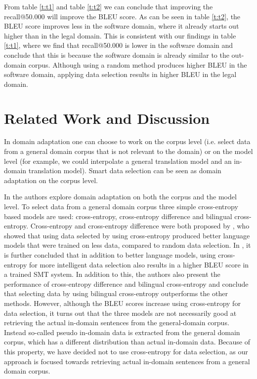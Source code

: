 \documentclass[11pt]{article}
\begin{document}
From table \ref{t:t1} and table \ref{t:t2} we can conclude that improving the recall@50.000 will improve the BLEU score. As can be seen in table \ref{t:t2}, the BLEU score improves less in the software domain, where it already starts out higher than in the legal domain. This is consistent with our findings in table \ref{t:t1}, where we find that recall@50.000 is lower in the software domain and conclude that this is because the software domain is already similar to the out-domain corpus. Although using a random method produces higher BLEU in the software domain, applying data selection results in higher BLEU in the legal domain.

\section{Related Work and Discussion}
\label{sec:related}
In domain adaptation one can choose to work on the corpus level (i.e. select data from a general domain corpus that is not relevant to the domain) or on the model level (for example, we could interpolate a general translation model and an in-domain translation model). Smart data selection can be seen as domain adaptation on the corpus level. 

In \cite{pseudo} the authors explore domain adaptation on both the corpus and the model level. To select data from a general domain corpus three simple cross-entropy based models are used: cross-entropy, cross-entropy difference and bilingual cross-entropy. Cross-entropy and cross-entropy difference were both proposed by \cite{intelligent}, who showed that using data selected by using cross-entropy produced better language models that were trained on less data, compared to random data selection. In \cite{pseudo}, it is further concluded that in addition to better language models, using cross-entropy for more intelligent data selection also results in a higher BLEU score in a trained SMT system. In addition to this, the authors also present the performance of cross-entropy difference and bilingual cross-entropy and conclude that selecting data by using bilingual cross-entropy outperforms the other methods. However, although the BLEU scores increase using cross-entropy for data selection, it turns out that the three models are not necessarily good at retrieving the actual in-domain sentences from the general-domain corpus. Instead so-called pseudo in-domain data is extracted from the general domain corpus, which has a different distribution than actual in-domain data. Because of this property, we have decided not to use cross-entropy for data selection, as our approach is focused towards retrieving actual in-domain sentences from a general domain corpus.
\end{document}
